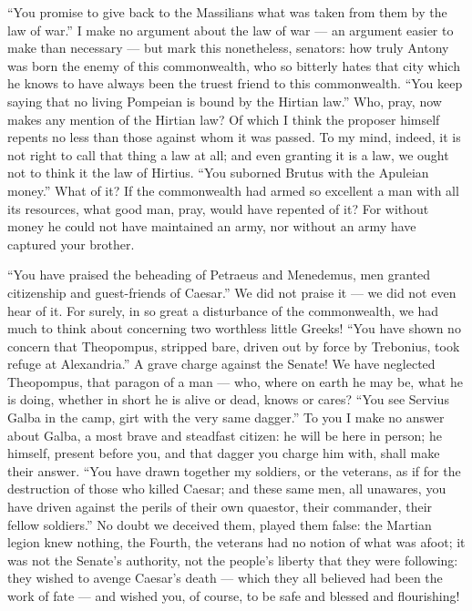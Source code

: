  ``You promise to give back to the Massilians what was taken from them by the law of war.'' I make no argument about the law of war --- an argument easier to make than necessary --- but mark this nonetheless, senators: how truly Antony was born the enemy of this commonwealth, who so bitterly hates that city which he knows to have always been the truest friend to this commonwealth. ``You keep saying that no living Pompeian is bound by the Hirtian law.'' Who, pray, now makes any mention of the Hirtian law? Of which I think the proposer himself repents no less than those against whom it was passed. To my mind, indeed, it is not right to call that thing a law at all; and even granting it is a law, we ought not to think it the law of Hirtius. ``You suborned Brutus with the Apuleian money.'' What of it? If the commonwealth had armed so excellent a man with all its resources, what good man, pray, would have repented of it? For without money he could not have maintained an army, nor without an army have captured your brother.

 ``You have praised the beheading of Petraeus and Menedemus, men granted citizenship and guest-friends of Caesar.'' We did not praise it --- we did not even hear of it. For surely, in so great a disturbance of the commonwealth, we had much to think about concerning two worthless little Greeks! ``You have shown no concern that Theopompus, stripped bare, driven out by force by Trebonius, took refuge at Alexandria.'' A grave charge against the Senate! We have neglected Theopompus, that paragon of a man --- who, where on earth he may be, what he is doing, whether in short he is alive or dead, knows or cares? ``You see Servius Galba in the camp, girt with the very same dagger.'' To you I make no answer about Galba, a most brave and steadfast citizen: he will be here in person; he himself, present before you, and that dagger you charge him with, shall make their answer. ``You have drawn together my soldiers, or the veterans, as if for the destruction of those who killed Caesar; and these same men, all unawares, you have driven against the perils of their own quaestor, their commander, their fellow soldiers.'' No doubt we deceived them, played them false: the Martian legion knew nothing, the Fourth, the veterans had no notion of what was afoot; it was not the Senate's authority, not the people's liberty that they were following: they wished to avenge Caesar's death --- which they all believed had been the work of fate --- and wished you, of course, to be safe and blessed and flourishing!


